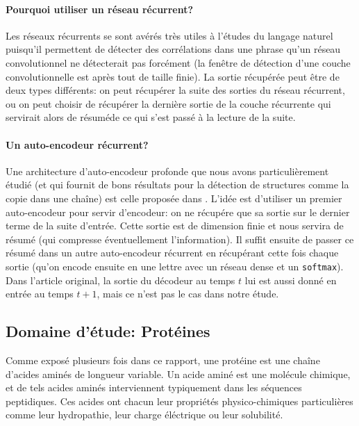 \documentclass[a4paper, 11pt, onecolumn]{article}
\begin{document}
\paragraph{Pourquoi utiliser un réseau récurrent?}

Les réseaux récurrents se sont avérés très utiles à l'études du langage naturel
puisqu'il permettent de détecter des corrélations dans une phrase qu'un réseau
convolutionnel ne détecterait pas forcément (la fenêtre de détection d'une
couche convolutionnelle est après tout de taille finie).  La sortie récupérée
peut être de deux types différents: on peut récupérer la suite des sorties du
réseau récurrent, ou on peut choisir de récupérer la dernière sortie de la
couche récurrente qui servirait alors de \og résumé\fg de ce qui s'est passé à
la lecture de la suite.

\paragraph{Un auto-encodeur récurrent?}

Une architecture d'auto-encodeur profonde que nous avons particulièrement étudié
(et qui fournit de bons résultats pour la détection de structures comme la copie
dans une chaîne) est celle proposée dans \cite{DBLP:journals/corr/ChoMGBSB14}.
L'idée est d'utiliser un premier auto-encodeur pour servir d'encodeur: on ne
récupére que sa sortie sur le dernier terme de la suite d'entrée. Cette sortie
est de dimension finie et nous servira de résumé (qui compresse éventuellement
l'information). Il suffit ensuite de passer ce résumé dans un autre
auto-encodeur récurrent en récupérant cette fois chaque sortie (qu'on encode
ensuite en une lettre avec un réseau dense et un \texttt{softmax}). Dans
l'article original, la sortie du décodeur au temps $t$ lui est aussi donné en
entrée au temps $t+1$, mais ce n'est pas le cas dans notre étude.

\subsection{Domaine d'étude: Protéines}

Comme exposé plusieurs fois dans ce rapport, une protéine est une chaîne
d'acides aminés de longueur variable. Un acide aminé est une molécule chimique,
et de tels acides aminés interviennent typiquement dans les séquences
peptidiques. Ces acides ont chacun leur propriétés physico-chimiques
particulières comme leur hydropathie, leur charge éléctrique ou leur solubilité.
\end{document}
